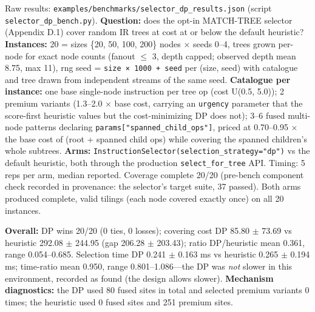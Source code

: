 \documentclass[
  11pt,
]{article}
\begin{document}
Raw results: \texttt{examples/benchmarks/selector\_dp\_results.json}
(script \texttt{selector\_dp\_bench.py}). \textbf{Question:} does the
opt-in MATCH-TREE selector (Appendix D.1) cover random IR trees at cost
at or below the default heuristic? \textbf{Instances:} 20 = sizes \{20,
50, 100, 200\} nodes \(\times\) seeds 0--4, trees grown per-node for
exact node counts (fanout \(\leq\) 3, depth capped; observed depth mean
8.75, max 11), rng seed = \texttt{size\ ×\ 1000\ +\ seed} per (size,
seed) with catalogue and tree drawn from independent streams of the same
seed. \textbf{Catalogue per instance:} one base single-node instruction
per tree op (cost U(0.5, 5.0)); 2 premium variants (1.3--2.0 \(\times\)
base cost, carrying an \texttt{urgency} parameter that the score-first
heuristic values but the cost-minimizing DP does not); 3--6 fused
multi-node patterns declaring
\texttt{params{[}"spanned\_child\_ops"{]}}, priced at 0.70--0.95
\(\times\) the base cost of (root + spanned child ops) while covering
the spanned children's whole subtrees. \textbf{Arms:}
\texttt{InstructionSelector(selection\_strategy="dp")} vs the default
heuristic, both through the production \texttt{select\_for\_tree} API.
Timing: 5 reps per arm, median reported. Coverage complete 20/20
(pre-bench component check recorded in provenance: the selector's target
suite, 37 passed). Both arms produced complete, valid tilings (each node
covered exactly once) on all 20 instances.

\textbf{Overall:} DP wins 20/20 (0 ties, 0 losses); covering cost DP
85.80 \(\pm\) 73.69 vs heuristic 292.08 \(\pm\) 244.95 (gap 206.28
\(\pm\) 203.43); ratio DP/heuristic mean 0.361, range 0.054--0.685.
Selection time DP 0.241 \(\pm\) 0.163 ms vs heuristic 0.265 \(\pm\)
0.194 ms; time-ratio mean 0.950, range 0.801--1.086---the DP was
\emph{not} slower in this environment, recorded as found (the design
allows slower). \textbf{Mechanism diagnostics:} the DP used 80 fused
sites in total and selected premium variants 0 times; the heuristic used
0 fused sites and 251 premium sites.
\end{document}

